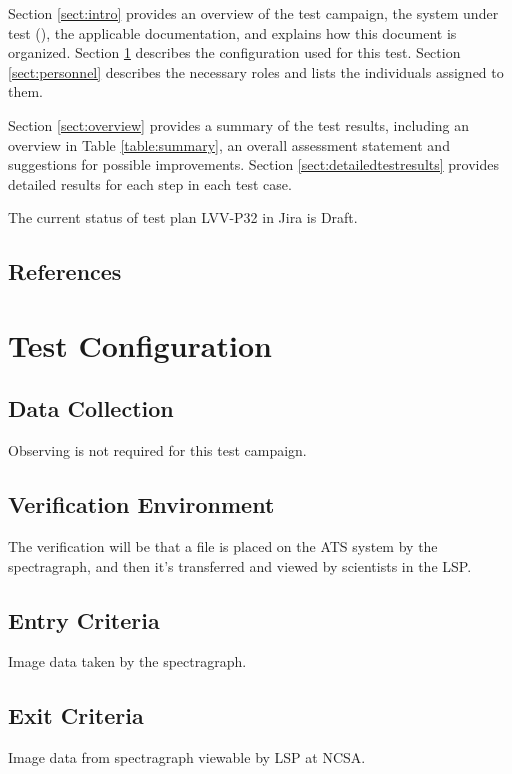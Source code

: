 \documentclass[DM,lsstdraft,STR,toc]{lsstdoc}
\begin{document}
Section \ref{sect:intro} provides an overview of the test campaign, the system under test (\product{}), the applicable documentation, and explains how this document is organized.
Section \ref{sect:configuration}  describes the configuration used for this test.
Section \ref{sect:personnel} describes the necessary roles and lists the individuals assigned to them.

Section \ref{sect:overview} provides a summary of the test results, including an overview in Table \ref{table:summary}, an overall assessment statement and suggestions for possible improvements.
Section \ref{sect:detailedtestresults} provides detailed results for each step in each test case.

The current status of test plan LVV-P32 in Jira is Draft.

\subsection{References}
\label{sect:references}
\renewcommand{\refname}{}

\section{Test Configuration}
\label{sect:configuration}

\subsection{Data Collection}

  Observing is not required for this test campaign.

\subsection{Verification Environment}
\label{sect:hwconf}
  The verification will be that a file is placed on the ATS system by the
spectragraph, and then it's transferred and viewed by scientists in the
LSP. ~


  \subsection{Entry Criteria}
  Image data taken by the spectragraph.~~


  \subsection{Exit Criteria}
  Image data from spectragraph viewable by LSP at NCSA.~
\end{document}
